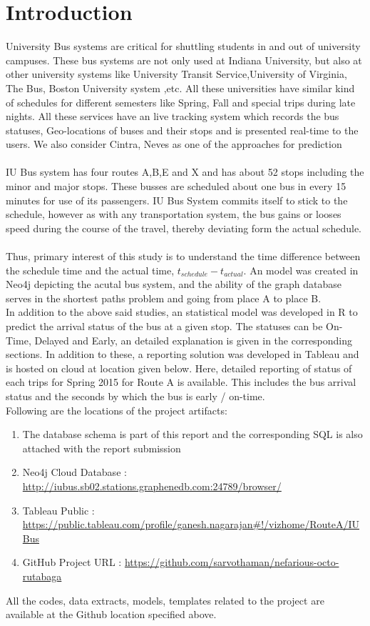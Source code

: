 \documentclass[12pt]{article}\usepackage[]{graphicx}\usepackage[]{color}
\begin{document}
\section{Introduction}
University Bus systems are critical for shuttling students in and out of university campuses. These bus systems are not only used at Indiana University, but also at other university systems like University Transit Service,University of Virginia\cite{2}, The Bus, Boston University system \cite{3} ,etc. All these universities have similar kind of schedules for different semesters like Spring, Fall and special trips during late nights. All these services have an live tracking system which records the bus statuses, Geo-locations of buses and their stops and is presented real-time to the users. We also consider Cintra, Neves as one of the approaches for prediction\cite{4}\\ \\
IU Bus system has four routes A,B,E and X and has about 52 stops including the minor and major stops. These busses are scheduled about one bus in every 15 minutes for use of its passengers. IU Bus System commits itself to stick to the schedule\cite{5}, however as with any transportation system, the bus gains or looses speed during the course of the travel, thereby deviating form the actual schedule. \\ \\
Thus, primary interest of this study is to understand the time difference between the schedule time and the actual time, $t_{schedule} - t_{actual}$. An model was created in Neo4j depicting the acutal bus system, and the ability of the graph database serves in the shortest paths problem and going from place A to place B. \\
In addition to the above said studies, an statistical model was developed in R to predict the arrival status of the bus at a given stop. The statuses can be On-Time, Delayed and Early, an detailed explanation is given in the corresponding sections. In addition to these, a reporting solution was developed in Tableau and is hosted on cloud at location given below. Here, detailed reporting of status of each trips for Spring 2015 for Route A is available. This includes the bus arrival status and the seconds by which the bus is early / on-time. \\

Following are the locations of the project artifacts:
\begin{enumerate}
\item The database schema is part of this report and the corresponding SQL is also attached with the report submission
\item Neo4j Cloud Database : \url{http://iubus.sb02.stations.graphenedb.com:24789/browser/}
\item Tableau Public : \url{https://public.tableau.com/profile/ganesh.nagarajan#!/vizhome/RouteA/IUBus}
\item GitHub Project URL : \url{https://github.com/sarvothaman/nefarious-octo-rutabaga}
\end{enumerate}
All the codes, data extracts, models, templates related to the project are available at the Github location specified above.
\end{document}
